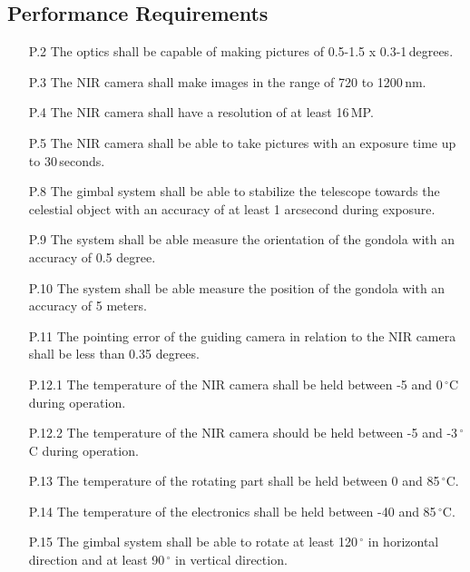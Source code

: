 \subsection{Performance Requirements}

\begin{enumerate}[topsep=0pt,itemsep=-1ex,partopsep=1ex,parsep=1ex]
    \item[P.2] The optics shall be capable of making pictures of 0.5-1.5 x 0.3-1\,degrees.
    \item[P.3] The NIR camera shall make images in the range of 720 to 1200\,nm.
    \item[P.4] The NIR camera shall have a resolution of at least 16\,MP.
    \item[P.5] The NIR camera shall be able to take pictures with an exposure time up to 30\,seconds.
    \item[P.8] The gimbal system shall be able to stabilize the telescope towards the celestial object with an accuracy of at least 1 arcsecond during exposure.
    \item[P.9] The system shall be able measure the orientation of the gondola with an accuracy of 0.5 degree.
	\item[P.10] The system shall be able measure the position of the gondola with an accuracy of 5 meters.
	\item[P.11] The pointing error of the guiding camera in relation to the NIR camera shall be less than 0.35 degrees.
	\item[P.12.1]The temperature of the NIR camera shall be held between -5 and 0\,$^\circ$C during operation.
	\item[P.12.2] The temperature of the NIR camera should be held between -5 and -3\,$^\circ$C during operation.
	\item[P.13] The temperature of the rotating part shall be held between 0 and 85\,$^\circ$C.
	\item[P.14] The temperature of the electronics shall be held between -40 and 85\,$^\circ$C.
	\item[P.15] The gimbal system shall be able to rotate at least 120\,$^\circ$ in horizontal direction and at least 90\,$^\circ$ in vertical direction.
\end{enumerate}
